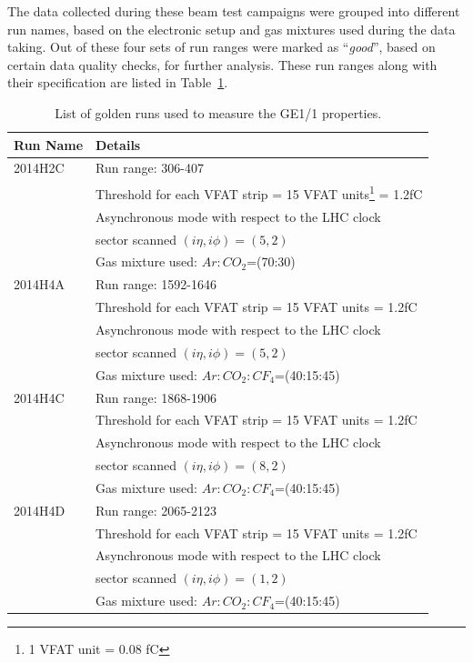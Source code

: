 The data collected during these beam test campaigns were grouped into different run names, based on the electronic setup and gas mixtures used during the data taking.
Out of these four sets of run ranges were marked as ``\textit{good}'', based on certain data quality checks, for further analysis. These run ranges along with their specification are listed in Table~\ref{tab:gemTBgoldenruns}.

\begin{table}
\begin{tabular}[!htbp]{l l}
\hline
\textbf{Run Name}   &   \textbf{Details}\\
\hline
2014H2C     & Run range: 306-407    \\
            & Threshold for each VFAT strip = 15 VFAT units\footnote{1 VFAT unit = 0.08 fC} = 1.2fC\\
            & Asynchronous mode with respect to the LHC clock \\
            & sector scanned $(i\eta, i\phi)=(5,2)$\\
            & Gas mixture used: $Ar:CO_{2}$=(70:30)\\
\hline
2014H4A     & Run range: 1592-1646 \\
            & Threshold for each VFAT strip = 15 VFAT units = 1.2fC\\
            & Asynchronous mode with respect to the LHC clock \\
            & sector scanned $(i\eta, i\phi)=(5,2)$\\
            & Gas mixture used: $Ar:CO_{2}:CF_4$=(40:15:45)\\
\hline
2014H4C     & Run range: 1868-1906 \\
            & Threshold for each VFAT strip = 15 VFAT units = 1.2fC\\
            & Asynchronous mode with respect to the LHC clock \\
            & sector scanned $(i\eta, i\phi)=(8,2)$\\
            & Gas mixture used: $Ar:CO_{2}:CF_4$=(40:15:45)\\
\hline
2014H4D     & Run range: 2065-2123 \\
            & Threshold for each VFAT strip = 15 VFAT units = 1.2fC\\
            & Asynchronous mode with respect to the LHC clock \\
            & sector scanned $(i\eta, i\phi)=(1,2)$\\             
            & Gas mixture used: $Ar:CO_{2}:CF_4$=(40:15:45)\\
\hline
\end{tabular}
\caption{List of golden runs used to measure the GE1/1 properties.}
\label{tab:gemTBgoldenruns}
\end{table}

